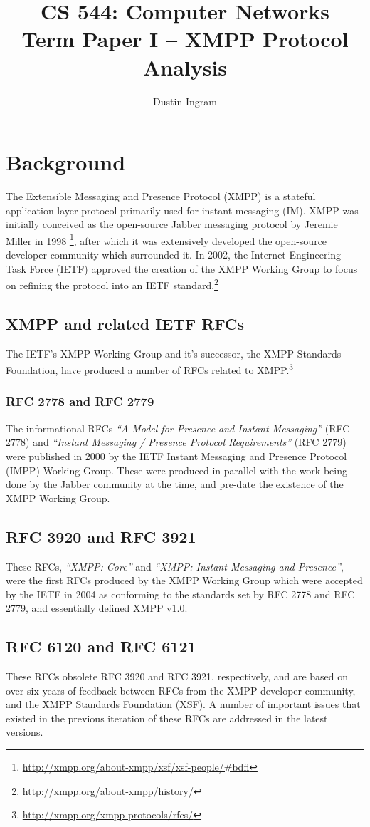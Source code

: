 \documentclass{article}
\title{CS 544: Computer Networks \\ Term Paper I -- XMPP Protocol Analysis}
\author{Dustin Ingram}
\begin{document}
\maketitle
\section{Background}
The Extensible Messaging and Presence Protocol (XMPP) is a stateful
application layer protocol primarily used for instant-messaging (IM). XMPP was
initially conceived as the open-source Jabber messaging protocol by Jeremie
Miller in 1998
\footnote{\url{http://xmpp.org/about-xmpp/xsf/xsf-people/\#bdfl}}, after which
it was extensively developed the open-source developer community which
surrounded it. In 2002, the Internet Engineering Task Force (IETF) approved the
creation of the XMPP Working Group to focus on refining the protocol into an
IETF standard.\footnote{\url{http://xmpp.org/about-xmpp/history/}}

\subsection{XMPP and related IETF RFCs}
The IETF's XMPP Working Group and it's successor, the XMPP Standards Foundation,
have produced a number of RFCs related to
XMPP.\footnote{\url{http://xmpp.org/xmpp-protocols/rfcs/}}

\subsubsection{RFC 2778 and RFC 2779}
The informational RFCs \emph{``A Model for Presence and Instant Messaging''}
(RFC 2778) and \emph{``Instant Messaging / Presence Protocol Requirements''}
(RFC 2779) were published in 2000 by the IETF Instant Messaging and Presence
Protocol (IMPP) Working Group. These were produced in parallel with the work
being done by the Jabber community at the time, and pre-date the existence of
the XMPP Working Group. 

\subsection{RFC 3920 and RFC 3921}
These RFCs, \emph{``XMPP: Core''} and \emph{``XMPP: Instant Messaging and
Presence''}, were the first RFCs produced by the XMPP Working Group which were
accepted by the IETF in 2004 as conforming to the standards set by RFC 2778 and
RFC 2779, and essentially defined XMPP v1.0.

\subsection{RFC 6120 and RFC 6121}
These RFCs obsolete RFC 3920 and RFC 3921, respectively, and are based on over
six years of feedback between RFCs from the XMPP developer community, and the
XMPP Standards Foundation (XSF). A number of important issues that existed in
the previous iteration of these RFCs are addressed in the latest versions.
\end{document}
